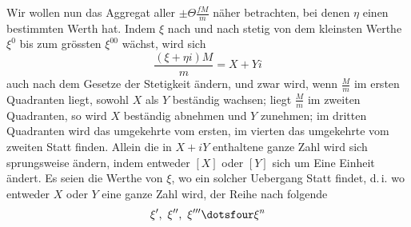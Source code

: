 Wir wollen nun das Aggregat aller $\pm\Theta\frac{fM}{m}$ näher betrachten, bei denen $\eta$ einen bestimmten Werth hat. Indem $\xi$ nach und nach stetig von dem kleinsten Werthe $\xi^0$ bis zum grössten $\xi^{00}$ wächst, wird sich
\[
\frac{(\xi+\eta i)M}{m}=X+Yi
\]
auch nach dem Gesetze der Stetigkeit ändern, und zwar wird, wenn $\frac{M}{m}$ im ersten Quadranten liegt, sowohl $X$ als $Y$ beständig wachsen; liegt $\frac{M}{m}$ im zweiten Quadranten, so wird $X$ beständig abnehmen und $Y$ zunehmen; im dritten Quadranten wird das umgekehrte vom ersten, im vierten das umgekehrte vom zweiten Statt finden. Allein die in $X+iY$ enthaltene ganze Zahl wird sich sprungsweise ändern, indem entweder $[X]$ oder $[Y]$ sich um Eine Einheit ändert. Es seien die Werthe von $\xi$, wo ein solcher Uebergang Statt findet, d.\,i. wo entweder $X$ oder $Y$ eine ganze Zahl wird, der Reihe nach folgende
\[
\xi',\ \xi'',\ \xi'''\dotsfour\xi^n
\]

